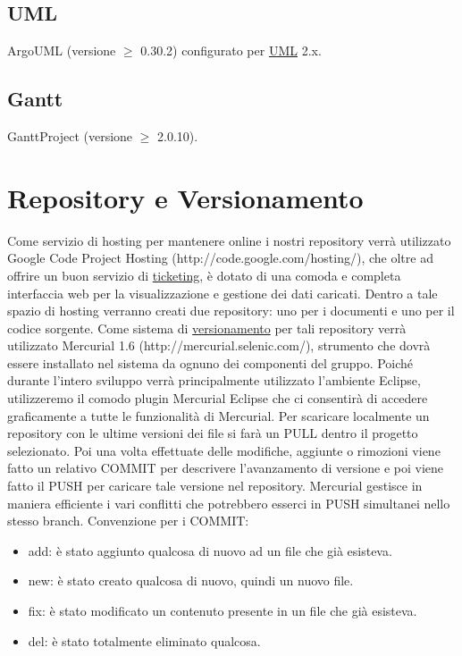 \section{UML}
ArgoUML (versione $\geq$ 0.30.2) configurato per \underline{UML} 2.x.

\section{Gantt}
GanttProject (versione $\geq$ 2.0.10).



\chapter{Repository e Versionamento}
\thispagestyle{fancy}
Come servizio di hosting per mantenere online i nostri repository
verr\`a utilizzato Google Code Project Hosting
(http://code.google.com/hosting/), che oltre ad offrire un buon servizio di
\underline{ticketing}, \`e dotato di una comoda e completa interfaccia web per
la visualizzazione e gestione dei dati caricati. Dentro a tale spazio di hosting
verranno creati due repository: uno per i documenti e uno per il codice
sorgente. Come sistema di \underline{versionamento} per tali repository verr\`a
utilizzato Mercurial 1.6 (http://mercurial.selenic.com/), strumento che dovr\`a essere
installato nel sistema da ognuno dei componenti del gruppo. Poich\'e durante
l'intero sviluppo verr\`a principalmente utilizzato l'ambiente Eclipse,
utilizzeremo il comodo plugin Mercurial Eclipse che ci consentir\`a di accedere
graficamente a tutte le funzionalit\`a di Mercurial. Per scaricare localmente un
repository con le ultime versioni dei file si far\`a un PULL dentro il progetto
selezionato. Poi una volta effettuate delle modifiche, aggiunte o rimozioni
viene fatto un relativo COMMIT per descrivere l'avanzamento di versione e poi
viene fatto il PUSH per caricare tale versione nel repository. Mercurial
gestisce in maniera efficiente i vari conflitti che potrebbero esserci in PUSH
simultanei nello stesso branch.
Convenzione per i COMMIT:
\begin{itemize}
\item add: \`e stato aggiunto qualcosa di nuovo ad un file che gi\`a esisteva.
\item new: \`e stato creato qualcosa di nuovo, quindi un nuovo file. 
\item fix: \`e stato modificato un contenuto presente in un file che gi\`a
esisteva. 
\item del: \`e stato totalmente eliminato qualcosa.
\end{itemize}

